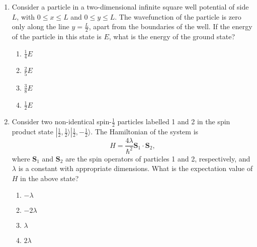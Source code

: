 \documentclass[journal]{IEEEtran}
\begin{document}
\begin{enumerate}
\begin{enumerate}
\item \begin{figure}[H]
	\centering
	
\end{figure} 
\item \begin{figure}[H]
	\centering
	
\end{figure} 
\end{enumerate}
\item Consider a particle in a two-dimensional infinite square well potential of side $L$, with $0 \leq x \leq L$ and $0 \leq y \leq L$. The wavefunction of the particle is zero only along the line $y = \frac{L}{2}$, apart from the boundaries of the well. If the energy of the particle in this state is $E$, what is the energy of the ground state?
\begin{enumerate}
\item $\frac{1}{4} E$
\item $\frac{2}{5} E$
\item $\frac{3}{8} E$
\item $\frac{1}{2} E$
\end{enumerate}
\item Consider two non-identical spin-$\frac{1}{2}$ particles labelled 1 and 2 in the spin product state $|\frac{1}{2}, \frac{1}{2}\rangle |\frac{1}{2}, -\frac{1}{2}\rangle$. The Hamiltonian of the system is 
\[
H = \frac{4\lambda}{\hbar^2} \mathbf{S}_1 \cdot \mathbf{S}_2,
\]
where $\mathbf{S}_1$ and $\mathbf{S}_2$ are the spin operators of particles 1 and 2, respectively, and $\lambda$ is a constant with appropriate dimensions. What is the expectation value of $H$ in the above state?
\begin{enumerate}
\item $-\lambda$
\item $-2\lambda$
\item $\lambda$
\item $2\lambda$
\end{enumerate}
\end{enumerate}
\end{document}
